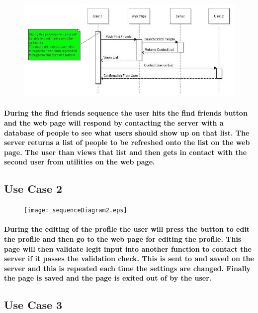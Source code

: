 \documentclass[12pt]{articlei}
\begin{document}
      \begin{figure}[h]
              \includegraphics[width =\linewidth]{sequenceDiagram1.eps}
      \end{figure}

    \paragraph{\normalfont \indent During the find friends sequence the user hits the find friends button and the web page will respond by contacting the server with a database of people to see what users should show up on that list. The server returns a list of people to be refreshed onto the list on the web page. The user than views that list and then gets in contact with the second user from utilities on the web page.
    }

  \newpage
  \subsection{\bf Use Case 2}

      \begin{figure}[h]
              \texttt{[image: sequenceDiagram2.eps]}
      \end{figure}

    \paragraph{\normalfont \indent During the editing of the profile the user will press the button to edit the profile and then go to the web page for editing the profile. This page will then validate legit input into another function to contact the server if it passes the validation check. This is sent to and saved on the server and this is repeated each time the settings are changed. Finally the page is saved and the page is exited out of by the user.
    }

  \newpage
  \subsection{\bf Use Case 3}
\end{document}
